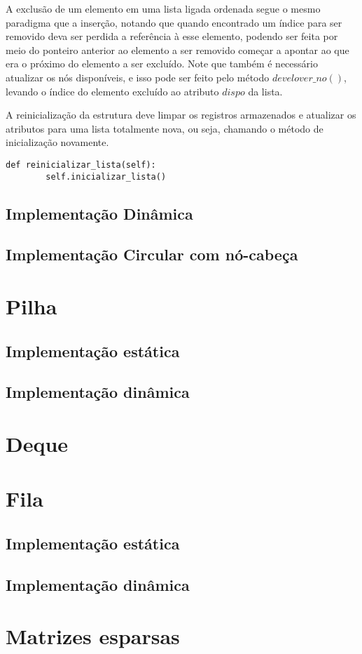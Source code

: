 \documentclass[a4paper, twocolumn]{article}
\theoremstyle{definition}
\begin{document}
A exclusão de um elemento em uma lista ligada ordenada segue o mesmo paradigma que a inserção, notando que quando encontrado um índice para ser removido deva ser perdida a referência à esse elemento, podendo ser feita por meio do ponteiro anterior ao elemento a ser removido começar a apontar ao que era o próximo do elemento a ser excluído. Note que também é necessário atualizar os nós disponíveis, e isso pode ser feito pelo método $develover\_no()$, levando o índice do elemento excluído ao atributo $dispo$ da lista.

A reinicialização da estrutura deve limpar os registros armazenados e atualizar os atributos para uma lista totalmente nova, ou seja, chamando o método de inicialização novamente.

\begin{lstlisting}[label=lista_ligada_estat_reiniciar,caption= Lista Ligada estática ordenada (reinicialização)]
def reinicializar_lista(self):
        self.inicializar_lista()
\end{lstlisting}

\subsection{Implementação Dinâmica}



\subsection{Implementação Circular com nó-cabeça}

\section{Pilha}

\subsection{Implementação estática}

\subsection{Implementação dinâmica}

\section{Deque}

\section{Fila}

\subsection{Implementação estática}

\subsection{Implementação dinâmica}

\section{Matrizes esparsas}
\end{document}
